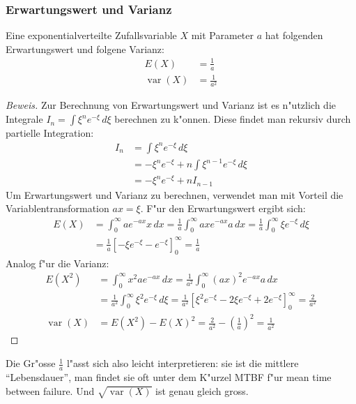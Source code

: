 \subsubsection{Erwartungswert und Varianz}
\begin{satz}Eine exponentialverteilte Zufallsvariable $X$ mit Parameter
$a$ hat folgenden Erwartungswert und folgene Varianz:
\begin{align*}
E(X)&=\frac1a\\
\operatorname{var}(X)&=\frac1{a^2}
\end{align*}
\end{satz}
\begin{proof}[Beweis]
Zur Berechnung von Erwartungswert und Varianz ist es n"utzlich die Integrale
$I_n=\int \xi^ne^{-\xi}\,d\xi$
berechnen zu k"onnen. Diese findet man rekursiv durch partielle Integration:
\begin{align*}
I_n&=\int \xi^ne^{-\xi}\,d\xi\\
&=-\xi^ne^{-\xi}+n\int \xi^{n-1}e^{-\xi}\,d\xi\\
&=-\xi^ne^{-\xi}+nI_{n-1}
\end{align*}
Um Erwartungswert und Varianz zu berechnen, verwendet man mit Vorteil die
Variablentransformation $ax=\xi$. F"ur den Erwartungswert ergibt sich:
\begin{align*}
E(X)&=\int_0^{\infty}ae^{-ax}x\,dx
=\frac1a\int_0^{\infty}ax e^{-ax}a\,dx
=\frac1a\int_0^{\infty}\xi e^{-\xi}\,d\xi\\
&=\frac1a\left[-\xi e^{-\xi}-e^{-\xi}\right]_0^\infty=\frac1a
\end{align*}
Analog f"ur die Varianz:
\begin{align*}
E(X^2)
&=
\int_0^{\infty}x^2ae^{-ax}\,dx
=\frac1{a^2}\int_0^{\infty}(ax)^2e^{-ax}a\,dx\\
&=\frac1{a^2}\int_0^{\infty}\xi^2e^{-\xi}\,d\xi
=\frac1{a^2}\left[\xi^2e^{-\xi}-2\xi e^{-\xi}+2e^{-\xi}\right]_0^\infty
=\frac2{a^2}
\\
\operatorname{var}(X)
&=E(X^2)-E(X)^2=\frac2{a^2}-\left(\frac1a\right)^2=\frac1{a^2}
\end{align*}
\end{proof}
Die Gr"osse $\frac1a$ l"asst sich also leicht interpretieren: sie ist die
mittlere ``Lebensdauer'', man findet sie oft unter dem K"urzel MTBF f"ur
mean time between failure.
Und $\sqrt{\operatorname{var}(X)}$ 
ist genau gleich gross. 
